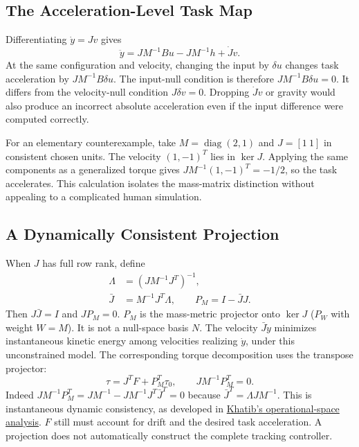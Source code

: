\subsection{The Acceleration-Level Task Map}

Differentiating $\dot y=Jv$ gives
\begin{equation}
\ddot y=JM^{-1}Bu-JM^{-1}h+\dot Jv.
\end{equation}
At the same configuration and velocity, changing the input by $\delta u$ changes task acceleration by $JM^{-1}B\delta u$. The input-null condition is therefore $JM^{-1}B\delta u=0$. It differs from the velocity-null condition $J\delta v=0$. Dropping $\dot Jv$ or gravity would also produce an incorrect absolute acceleration even if the input difference were computed correctly.

For an elementary counterexample, take $M=\operatorname{diag}(2,1)$ and $J=[1\ 1]$ in consistent chosen units. The velocity $(1,-1)^T$ lies in $\ker J$. Applying the same components as a generalized torque gives $JM^{-1}(1,-1)^T=-1/2$, so the task accelerates. This calculation isolates the mass-matrix distinction without appealing to a complicated human simulation.

\subsection{A Dynamically Consistent Projection}

When $J$ has full row rank, define
\begin{equation}
\begin{aligned}
\Lambda&=(JM^{-1}J^T)^{-1},\\
\bar J&=M^{-1}J^T\Lambda,\qquad P_M=I-\bar J J.
\end{aligned}
\end{equation}
Then $J\bar J=I$ and $JP_M=0$. $P_M$ is the mass-metric projector onto $\ker J$ ($P_W$ with weight $W=M$). It is not a null-space basis $N$. The velocity $\bar J\dot y$ minimizes instantaneous kinetic energy among velocities realizing $\dot y$, under this unconstrained model. The corresponding torque decomposition uses the transpose projector:
\begin{equation}
\tau=J^TF+P_M^T\tau_0,\qquad JM^{-1}P_M^T=0.
\label{eq:ch23_control_decomposition}
\end{equation}
Indeed $JM^{-1}P_M^T=JM^{-1}-JM^{-1}J^T\bar J^T=0$ because $\bar J^T=\Lambda JM^{-1}$. This is instantaneous dynamic consistency, as developed in \href{https://khatib.stanford.edu/publications/pdfs/Khatib_1990_2.pdf}{Khatib's operational-space analysis}. $F$ still must account for drift and the desired task acceleration. A projection does not automatically construct the complete tracking controller.


